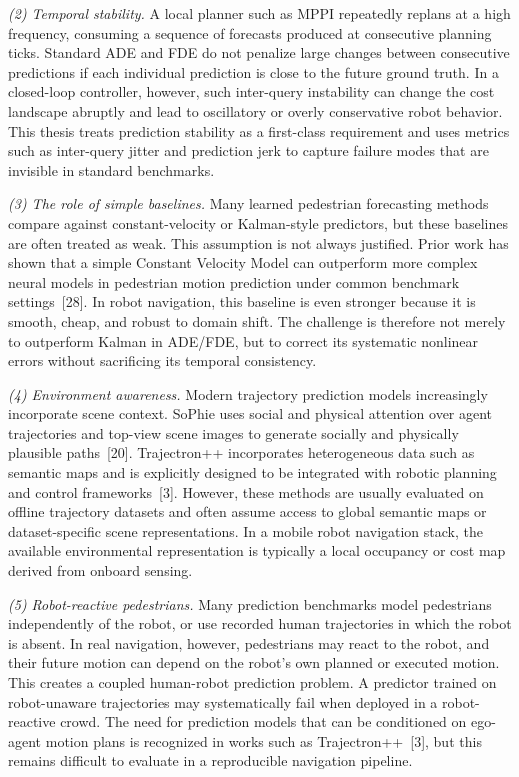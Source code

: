 \documentclass[12pt, a4paper]{article}
\begin{document}
\emph{(2) Temporal stability.} A local planner such as MPPI repeatedly replans at a high frequency, consuming a sequence of forecasts produced at consecutive planning ticks. Standard ADE and FDE do not penalize large changes between consecutive predictions if each individual prediction is close to the future ground truth. In a closed-loop controller, however, such inter-query instability can change the cost landscape abruptly and lead to oscillatory or overly conservative robot behavior. This thesis treats prediction stability as a first-class requirement and uses metrics such as inter-query jitter and prediction jerk to capture failure modes that are invisible in standard benchmarks.

\emph{(3) The role of simple baselines.} Many learned pedestrian forecasting methods compare against constant-velocity or Kalman-style predictors, but these baselines are often treated as weak. This assumption is not always justified. Prior work has shown that a simple Constant Velocity Model can outperform more complex neural models in pedestrian motion prediction under common benchmark settings~[28]. In robot navigation, this baseline is even stronger because it is smooth, cheap, and robust to domain shift. The challenge is therefore not merely to outperform Kalman in ADE/FDE, but to correct its systematic nonlinear errors without sacrificing its temporal consistency.

\emph{(4) Environment awareness.} Modern trajectory prediction models increasingly incorporate scene context. SoPhie uses social and physical attention over agent trajectories and top-view scene images to generate socially and physically plausible paths~[20]. Trajectron++ incorporates heterogeneous data such as semantic maps and is explicitly designed to be integrated with robotic planning and control frameworks~[3]. However, these methods are usually evaluated on offline trajectory datasets and often assume access to global semantic maps or dataset-specific scene representations. In a mobile robot navigation stack, the available environmental representation is typically a local occupancy or cost map derived from onboard sensing.

\emph{(5) Robot-reactive pedestrians.} Many prediction benchmarks model pedestrians independently of the robot, or use recorded human trajectories in which the robot is absent. In real navigation, however, pedestrians may react to the robot, and their future motion can depend on the robot's own planned or executed motion. This creates a coupled human-robot prediction problem. A predictor trained on robot-unaware trajectories may systematically fail when deployed in a robot-reactive crowd. The need for prediction models that can be conditioned on ego-agent motion plans is recognized in works such as Trajectron++~[3], but this remains difficult to evaluate in a reproducible navigation pipeline.
\end{document}
